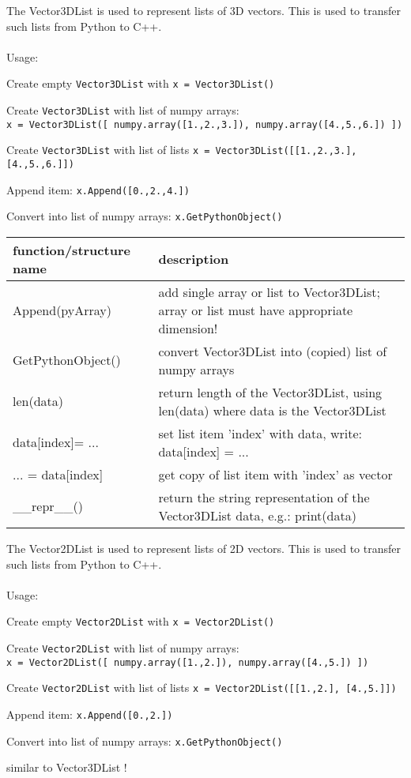 The Vector3DList is used to represent lists of 3D vectors. This is used to transfer such lists from Python to C++. \\ \\ Usage: \bi
  \item Create empty \texttt{Vector3DList} with \texttt{x = Vector3DList()} 
  \item Create \texttt{Vector3DList} with list of numpy arrays:\\ \texttt{x = Vector3DList([ numpy.array([1.,2.,3.]), numpy.array([4.,5.,6.]) ])}
  \item Create \texttt{Vector3DList} with list of lists \texttt{x = Vector3DList([[1.,2.,3.], [4.,5.,6.]])}
  \item Append item: \texttt{x.Append([0.,2.,4.])}
  \item Convert into list of numpy arrays: \texttt{x.GetPythonObject()}
\ei


\begin{center}
\footnotesize
\begin{longtable}{| p{8cm} | p{8cm} |} 
\hline
{\bf function/structure name} & {\bf description}\\ \hline
  Append(pyArray) & add single array or list to Vector3DList; array or list must have appropriate dimension!\\ \hline 
  GetPythonObject() & convert Vector3DList into (copied) list of numpy arrays\\ \hline 
  len(data) & return length of the Vector3DList, using len(data) where data is the Vector3DList\\ \hline 
  data[index]= ... & set list item 'index' with data, write: data[index] = ...\\ \hline 
  ... = data[index] & get copy of list item with 'index' as vector\\ \hline 
  \_\_repr\_\_() & return the string representation of the Vector3DList data, e.g.: print(data)\\ \hline 
\end{longtable}
\end{center}

The Vector2DList is used to represent lists of 2D vectors. This is used to transfer such lists from Python to C++. \\ \\ Usage: \bi
  \item Create empty \texttt{Vector2DList} with \texttt{x = Vector2DList()} 
  \item Create \texttt{Vector2DList} with list of numpy arrays:\\ \texttt{x = Vector2DList([ numpy.array([1.,2.]), numpy.array([4.,5.]) ])}
  \item Create \texttt{Vector2DList} with list of lists \texttt{x = Vector2DList([[1.,2.], [4.,5.]])}
  \item Append item: \texttt{x.Append([0.,2.])}
  \item Convert into list of numpy arrays: \texttt{x.GetPythonObject()}
  \item similar to Vector3DList !
\ei


